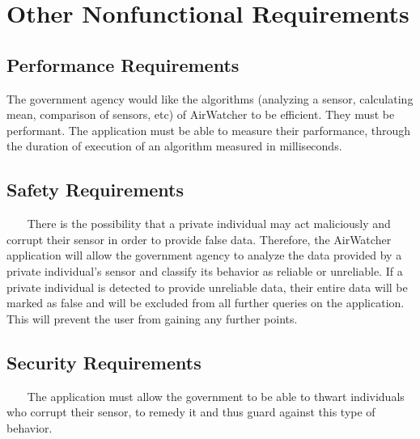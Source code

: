 \documentclass{report}
\begin{document}
\chapter{Other Nonfunctional Requirements}

\section{Performance Requirements}
The government agency would like the algorithms (analyzing a sensor, calculating mean, comparison
of sensors, etc) of AirWatcher to be efficient. They must be performant. The application must be
able to measure their parformance, through the duration of execution of an algorithm measured in
milliseconds.

\section{Safety Requirements} ~~~
There is the possibility that a private individual may act maliciously and corrupt their sensor in order
to provide false data. Therefore, the AirWatcher application will allow the government agency to
analyze the data provided by a private individual’s sensor and classify its behavior as reliable or
unreliable. If a private individual is detected to provide unreliable data, their entire data will be
marked as false and will be excluded from all further queries on the application. This will prevent the
user from gaining any further points.


\section{Security Requirements} ~~~
The application must allow the government to be able to thwart individuals who
corrupt their sensor, to remedy it and thus guard against this type of behavior.
\end{document}
